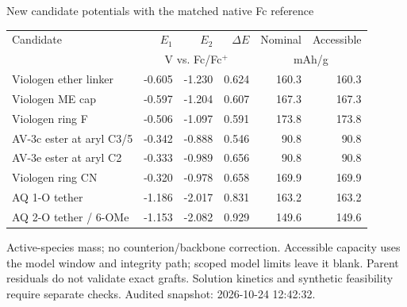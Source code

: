 \begin{frame}{New candidate potentials with the matched native Fc reference}
\scriptsize\renewcommand{\arraystretch}{1.25}\centering
\begin{tabular}{@{}p{4.7cm}rrrrr@{}}\toprule
Candidate & $E_1$ & $E_2$ & $\Delta E$ & Nominal & Accessible \\
& \multicolumn{3}{c}{V vs. Fc/Fc$^+$} & \multicolumn{2}{c}{mAh/g} \\ \midrule
Viologen ether linker & -0.605 & -1.230 & 0.624 & 160.3 & 160.3 \\
Viologen ME cap & -0.597 & -1.204 & 0.607 & 167.3 & 167.3 \\
Viologen ring F & -0.506 & -1.097 & 0.591 & 173.8 & 173.8 \\
AV-3c ester at aryl C3/5 & -0.342 & -0.888 & 0.546 & 90.8 & 90.8 \\
AV-3e ester at aryl C2 & -0.333 & -0.989 & 0.656 & 90.8 & 90.8 \\
Viologen ring CN & -0.320 & -0.978 & 0.658 & 169.9 & 169.9 \\
AQ 1-O tether & -1.186 & -2.017 & 0.831 & 163.2 & 163.2 \\
AQ 2-O tether / 6-OMe & -1.153 & -2.082 & 0.929 & 149.6 & 149.6 \\
\bottomrule\end{tabular}\par
\vspace{1ex}\raggedright
\footnotesize Active-species mass; no counterion/backbone correction. Accessible capacity uses the model window and integrity path; scoped model limits leave it blank.
\vspace{1ex}\scriptsize Parent residuals do not validate exact grafts. Solution kinetics and synthetic feasibility require separate checks.
\vfill\scriptsize Audited snapshot: 2026-10-24 12:42:32.
\end{frame}
